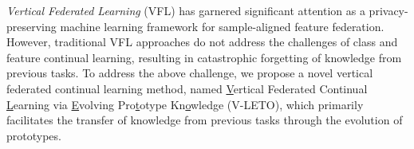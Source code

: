 \textit{Vertical Federated Learning} (VFL) has garnered significant attention as a privacy-preserving machine learning framework for sample-aligned feature federation.
However, traditional VFL approaches do not address the challenges of class and feature continual learning, resulting in catastrophic forgetting of knowledge from previous tasks.
To address the above challenge, we propose a novel vertical federated continual learning method, named \underline{V}ertical Federated Continual \underline{L}earning via \underline{E}volving Pro\underline{t}otype Kn\underline{o}wledge (V-LETO), which primarily facilitates the transfer of knowledge from previous tasks through the evolution of prototypes.
